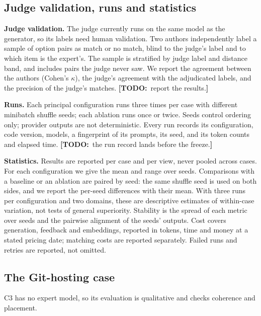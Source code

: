 \documentclass[conference]{IEEEtran}
\newcommand{\todo}[1]{{\color{red}\textbf{[TODO:}~#1\textbf{]}}}
\begin{document}
\subsection{Judge validation, runs and statistics}

\textbf{Judge validation.} The judge currently runs on the same model as the generator, so its labels need human validation. Two authors independently label a sample of option pairs as match or no match, blind to the judge's label and to which item is the expert's. The sample is stratified by judge label and distance band, and includes pairs the judge never saw. We report the agreement between the authors (Cohen's $\kappa$), the judge's agreement with the adjudicated labels, and the precision of the judge's matches. \todo{report the results.}

\textbf{Runs.} Each principal configuration runs three times per case with different minibatch shuffle seeds; each ablation runs once or twice. Seeds control ordering only; provider outputs are not deterministic. Every run records its configuration, code version, models, a fingerprint of its prompts, its seed, and its token counts and elapsed time. \todo{the run record lands before the freeze.}

\textbf{Statistics.} Results are reported per case and per view, never pooled across cases. For each configuration we give the mean and range over seeds. Comparisons with a baseline or an ablation are paired by seed: the same shuffle seed is used on both sides, and we report the per-seed differences with their mean. With three runs per configuration and two domains, these are descriptive estimates of within-case variation, not tests of general superiority. Stability is the spread of each metric over seeds and the pairwise alignment of the seeds' outputs. Cost covers generation, feedback and embeddings, reported in tokens, time and money at a stated pricing date; matching costs are reported separately. Failed runs and retries are reported, not omitted.

\subsection{The Git-hosting case}\label{sec:c3}

C3 has no expert model, so its evaluation is qualitative and checks coherence and placement.
\end{document}
